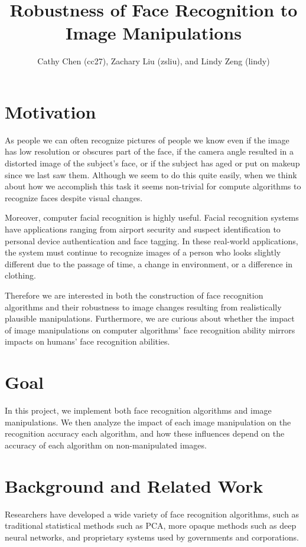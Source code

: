 \documentclass[pageno]{cos429}
\begin{document}
\title{Robustness of Face Recognition to Image Manipulations}

\author{Cathy Chen (cc27), Zachary Liu (zsliu), and Lindy Zeng (lindy)}
\date{}
\maketitle

\section{Motivation}
As people we can often recognize pictures of people we know even if the image has low resolution or obscures part of the face, if the camera angle resulted in a distorted image of the subject's face, or if the subject has aged or put on makeup since we last saw them. Although we seem to do this quite easily, when we think about how we accomplish this task it seems non-trivial for compute algorithms to recognize faces despite visual changes.

Moreover, computer facial recognition is highly useful. Facial recognition systems have applications ranging from airport security and suspect identification to personal device authentication and face tagging\cite{huang_face_2011}. In these real-world applications, the system must continue to recognize images of a person who looks slightly different due to the passage of time, a change in environment, or a difference in clothing.

Therefore we are interested in both the construction of face recognition algorithms and their robustness to image changes resulting from realistically plausible manipulations. Furthermore, we are curious about whether the impact of image manipulations on computer algorithms' face recognition ability mirrors impacts on humans' face recognition abilities.

\section{Goal}
In this project, we implement both face recognition algorithms and image manipulations. We then analyze the impact of each image manipulation on the recognition accuracy each algorithm, and how these influences depend on the accuracy of each algorithm on non-manipulated images.

\section{Background and Related Work}
Researchers have developed a wide variety of face recognition algorithms, such as traditional statistical methods such as PCA, more opaque methods such as deep neural networks, and proprietary systems used by governments and corporations\cite{noauthor_face_nodate}\cite{schroff_facenet:_2015}\cite{sun_meet_2017}.
\end{document}
